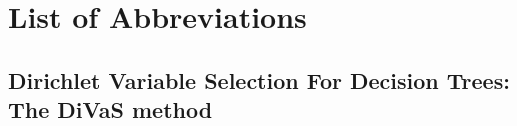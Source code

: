 \documentclass[12pt]{article}
\def\listofabbreviations{ \clearpage}
\begin{document}
\clearpage
{}
\chapter{\LARGE{\textbf{List of Abbreviations}}}
\listofabbreviations
\pagebreak

\cleardoublepage
{}



 
 




 \section{Dirichlet Variable Selection For Decision Trees: The DiVaS method}
\label{ch:var_select}





%



\end{document}
